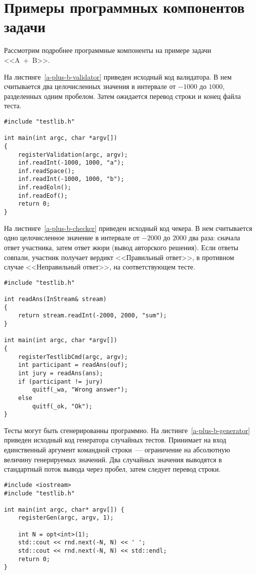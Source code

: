 \documentclass[times,specification,annotation]{style/itmo-student-thesis/itmo-student-thesis}
\begin{document}
\section{Примеры программных компонентов задачи}

Рассмотрим подробнее программные компоненты на примере задачи <<A~+~B>>.

На листинге~\ref{a-plus-b-validator} приведен исходный код валидатора. В нем считывается два целочисленных значения в интервале от $-1000$ до $1000$, разделенных одним пробелом. Затем ожидается перевод строки и конец файла теста.

\begin{lstlisting}[float=!h,caption={Пример валидатора},label={a-plus-b-validator}]
#include "testlib.h"

int main(int argc, char *argv[])
{
    registerValidation(argc, argv);
    inf.readInt(-1000, 1000, "a");
    inf.readSpace();
    inf.readInt(-1000, 1000, "b");
    inf.readEoln();
    inf.readEof();
    return 0;
}
\end{lstlisting}

На листинге~\ref{a-plus-b-checker} приведен исходный код чекера. В нем считывается одно целочисленное значение в интервале от $-2000$ до $2000$ два раза: сначала ответ участника, затем ответ жюри (вывод авторского решения). Если ответы совпали, участник получает вердикт <<Правильный ответ>>, в противном случае <<Неправильный ответ>>, на соответствующем тесте.

\begin{lstlisting}[float=!h,caption={Пример чекера},label={a-plus-b-checker}]
#include "testlib.h"

int readAns(InStream& stream)
{
    return stream.readInt(-2000, 2000, "sum");
}

int main(int argc, char *argv[])
{
    registerTestlibCmd(argc, argv);
    int participant = readAns(ouf);
    int jury = readAns(ans);
    if (participant != jury)
        quitf(_wa, "Wrong answer");
    else
        quitf(_ok, "Ok");
}
\end{lstlisting}

Тесты могут быть сгенерированны программно. На листинге~\ref{a-plus-b-generator} приведен исходный код генератора случайных тестов. Принимает на вход единственный аргумент командной строки~--- ограничение на абсолютную величину генерируемых значений. Два случайных значения выводятся в стандартный поток вывода через пробел, затем следует перевод строки.

\begin{lstlisting}[float=!h,caption={Пример генератора},label={a-plus-b-generator}]
#include <iostream>
#include "testlib.h"
 
int main(int argc, char* argv[]) {
    registerGen(argc, argv, 1);
 
    int N = opt<int>(1);
    std::cout << rnd.next(-N, N) << ' ';
    std::cout << rnd.next(-N, N) << std::endl;
    return 0;
}
\end{lstlisting}
\end{document}
